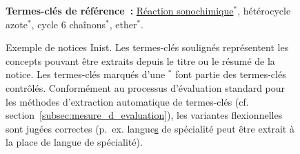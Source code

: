 \begin{figure}
\begin{minipage}{\linewidth}
{{          \vspace{-0.5em}
          \textbf{Termes-clés de référence~:} \underline{Réaction
          sonochimique$^*$}, hétérocycle azote$^*$, cycle 6 chaînons$^*$,
          ether$^*$.
        }
      }
    \end{minipage}
    \caption{Exemple de notices Inist. Les termes-clés soulignés représentent
             les concepts pouvant être extraits depuis le titre ou le résumé de
             la notice. Les termes-clés marqués d'une $^*$ font partie des
             termes-clés contrôlés. Conformément au processus d'évaluation
             standard pour les méthodes d'extraction automatique de termes-clés
             (cf. section~\ref{subsec:mesure_d_evaluation}), les variantes
             flexionnelles sont jugées correctes (p.~ex.
             \og{}langue\underline{s} de  spécialité\fg{} peut être extrait à la
             place de \og{}langue de spécialité\fg{}).
             \label{fig:exemple_notice_inist}}
  \end{figure}

